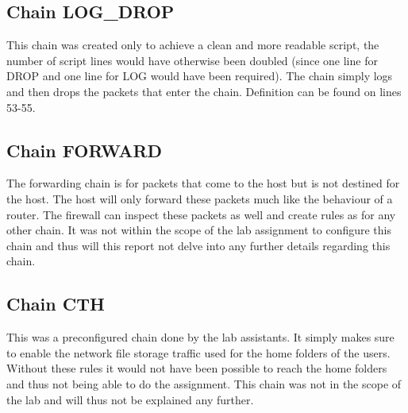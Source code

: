\subsection{Chain LOG\_DROP}
This chain was created only to achieve a clean and more readable script, the number of script lines would have otherwise been doubled (since one line for DROP and one line for LOG would have been required). The chain simply logs and then drops the packets that enter the chain. Definition can be found on lines 53-55.

\subsection{Chain FORWARD}
The forwarding chain is for packets that come to the host but is not destined for the host. The host will only forward these packets much like the behaviour of a router. The firewall can inspect these packets as well and create rules as for any other chain. It was not within the scope of the lab assignment to configure this chain and thus will this report not delve into any further details regarding this chain.

\subsection{Chain CTH}
This was a preconfigured chain done by the lab assistants. It simply makes sure to enable the network file storage traffic used for the home folders of the users. Without these rules it would not have been possible to reach the home folders and thus not being able to do the assignment. This chain was not in the scope of the lab and will thus not be explained any further.


